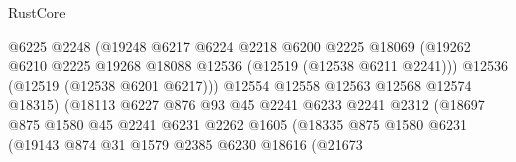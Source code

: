 \begin{lexlean}{RustCore}
\begin{coremodule}
                                        @6225
                                        @2248
                                        (@19248
                                          @6217
                                          @6224
                                          @2218
                                          @6200
                                          @2225
                                          @18069
                                          (@19262
                                            @6210
                                            @2225
                                            @19268
                                            @18088
                                            @12536
                                            (@12519 (@12538 @6211 @2241)))
                                          @12536
                                          (@12519 (@12538 @6201 @6217)))
                                        @12554
                                        @12558
                                        @12563
                                        @12568
                                        @12574
                                        @18315)
                                      (@18113
                                        @6227
                                        @876
                                        @93
                                        @45
                                        @2241
                                        @6233
                                        @2241
                                        @2312
                                        (@18697
                                          @875
                                          @1580
                                          @45
                                          @2241
                                          @6231
                                          @2262
                                          @1605
                                          (@18335
                                            @875
                                            @1580
                                            @6231
                                            (@19143
                                              @874
                                              @31
                                              @1579
                                              @2385
                                              @6230
                                              @18616
                                              (@21673

\end{coremodule}
\end{lexlean}
